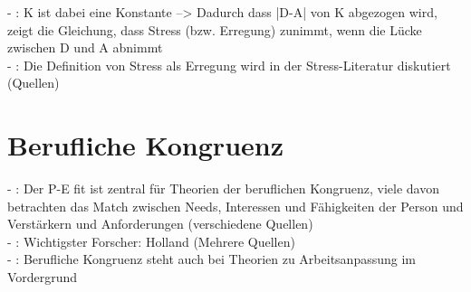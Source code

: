 - \cite[S. 17]{edwards:2008}: K ist dabei eine Konstante --> Dadurch dass |D-A| von K abgezogen wird, zeigt die Gleichung, dass Stress (bzw. Erregung) zunimmt, wenn die Lücke zwischen D und A abnimmt \\
- \cite[S. 18]{edwards:2008}: Die Definition von Stress als Erregung wird in der Stress-Literatur diskutiert (Quellen)

\section{Berufliche Kongruenz}
\label{ch:notizen:beruflicheKongruenz}
- \cite[S. 25]{edwards:2008}: Der P-E fit ist zentral für Theorien der beruflichen Kongruenz, viele davon betrachten das Match zwischen Needs, Interessen und Fähigkeiten der Person und Verstärkern und Anforderungen (verschiedene Quellen) \\
- \cite[S. 26]{edwards:2008}: Wichtigster Forscher: Holland (Mehrere Quellen) \\
- \cite[S. 26]{edwards:2008}: Berufliche Kongruenz steht auch bei Theorien zu Arbeitsanpassung im Vordergrund

